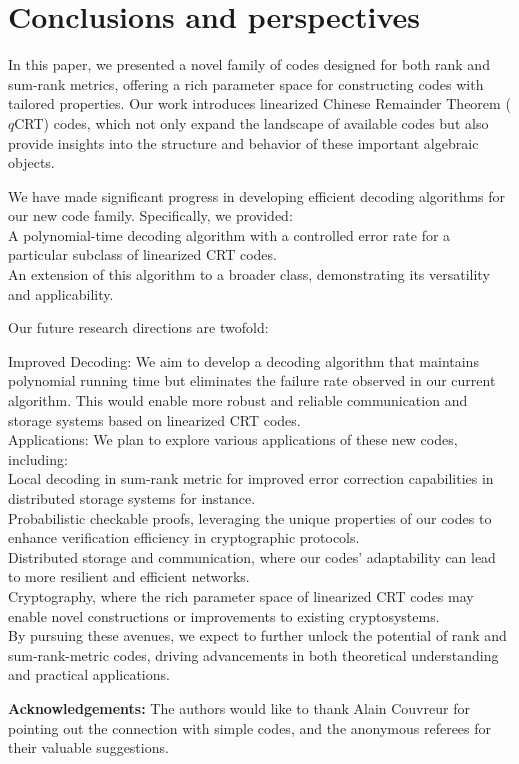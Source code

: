\documentclass{article}
\newcommand{\tmstrong}[1]{\textbf{#1}}
\theoremstyle{definition}
\begin{document}
\section{Conclusions and perspectives}

In this paper, we presented a novel family of codes designed for both rank and sum-rank metrics, offering a rich parameter space for constructing codes with tailored properties. Our work introduces linearized Chinese Remainder Theorem ($q$CRT) codes, which not only expand the landscape of available codes but also provide insights into the structure and behavior of these important algebraic objects.

We have made significant progress in developing efficient decoding algorithms for our new code family. Specifically, we provided: \\
A polynomial-time decoding algorithm with a controlled error rate for a particular subclass of linearized CRT codes.\\
An extension of this algorithm to a broader class, demonstrating its versatility and applicability.

Our future research directions are twofold:

Improved Decoding: We aim to develop a decoding algorithm that maintains polynomial running time but eliminates the failure rate observed in our current algorithm. This would enable more robust and reliable communication and storage systems based on linearized CRT codes.\\
Applications: We plan to explore various applications of these new codes, including:\\
Local decoding in sum-rank metric for improved error correction capabilities in distributed storage systems for instance.\\
Probabilistic checkable proofs, leveraging the unique properties of our codes to enhance verification efficiency in cryptographic protocols.\\
Distributed storage and communication, where our codes' adaptability can lead to more resilient and efficient networks.\\
Cryptography, where the rich parameter space of linearized CRT codes may enable novel constructions or improvements to existing cryptosystems.\\
By pursuing these avenues, we expect to further unlock the potential of rank and sum-rank-metric codes, driving advancements in both theoretical understanding and practical applications.

\tmstrong{Acknowledgements:} The authors would like to thank Alain Couvreur for pointing out the connection with simple codes, and the anonymous referees for their valuable suggestions.



\end{document}
